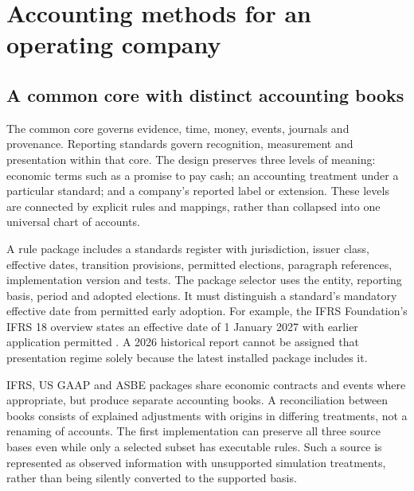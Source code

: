 \chapter{Accounting methods for an operating company}
\label{ch:modules}

\section{A common core with distinct accounting books}

The common core governs evidence, time, money, events, journals and provenance.
Reporting standards govern recognition, measurement and presentation within
that core. The design preserves three levels of meaning: economic terms such
as a promise to pay cash; an accounting treatment under a particular standard;
and a company's reported label or extension. These levels are connected by
explicit rules and mappings, rather than collapsed into one universal chart
of accounts.

A rule package includes a standards register with jurisdiction, issuer class,
effective dates, transition provisions, permitted elections, paragraph
references, implementation version and tests. The package selector uses the
entity, reporting basis, period and adopted elections. It must distinguish a
standard's mandatory effective date from permitted early adoption. For example,
the IFRS Foundation's IFRS 18 overview states an effective date of 1 January
2027 with earlier application permitted \citep{ifrs18}. A 2026 historical
report cannot be assigned that presentation regime solely because the latest
installed package includes it.

IFRS, US GAAP and ASBE packages share economic contracts and events where
appropriate, but produce separate accounting books. A reconciliation between
books consists of explained adjustments with origins in differing treatments,
not a renaming of accounts. The first implementation can preserve all three
source bases even while only a selected subset has executable rules. Such a
source is represented as observed information with unsupported simulation
treatments, rather than being silently converted to the supported basis.

